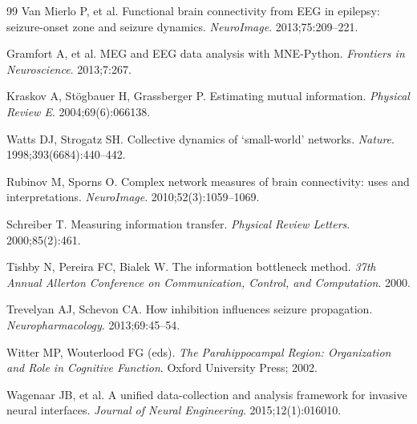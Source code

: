 \documentclass[final,5p,times,twocolumn]{elsarticle}
\begin{document}
\begin{thebibliography}{99}
  Van Mierlo P, et al.
  Functional brain connectivity from EEG in epilepsy: seizure-onset
  zone and seizure dynamics.
  \textit{NeuroImage}. 2013;75:209--221.

  Gramfort A, et al.
  MEG and EEG data analysis with MNE-Python.
  \textit{Frontiers in Neuroscience}. 2013;7:267.

  Kraskov A, St\"{o}gbauer H, Grassberger P.
  Estimating mutual information.
  \textit{Physical Review E}. 2004;69(6):066138.

  Watts DJ, Strogatz SH.
  Collective dynamics of `small-world' networks.
  \textit{Nature}. 1998;393(6684):440--442.

  Rubinov M, Sporns O.
  Complex network measures of brain connectivity: uses and
  interpretations.
  \textit{NeuroImage}. 2010;52(3):1059--1069.

  Schreiber T.
  Measuring information transfer.
  \textit{Physical Review Letters}. 2000;85(2):461.

  Tishby N, Pereira FC, Bialek W.
  The information bottleneck method.
  \textit{37th Annual Allerton Conference on Communication, Control,
  and Computation}. 2000.

  Trevelyan AJ, Schevon CA.
  How inhibition influences seizure propagation.
  \textit{Neuropharmacology}. 2013;69:45--54.

  Witter MP, Wouterlood FG (eds).
  \textit{The Parahippocampal Region: Organization and Role in Cognitive
  Function}. Oxford University Press; 2002.

  Wagenaar JB, et al.
  A unified data-collection and analysis framework for invasive neural
  interfaces.
  \textit{Journal of Neural Engineering}. 2015;12(1):016010.

\end{thebibliography}
\end{document}
